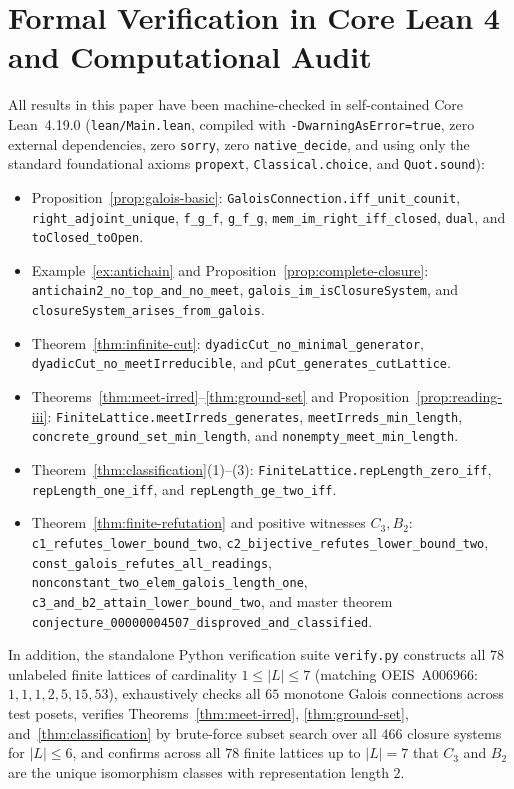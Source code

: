 \documentclass[11pt,a4paper]{article}
\theoremstyle{definition}
\theoremstyle{remark}
\begin{document}
\section{Formal Verification in Core Lean 4 and Computational Audit}

All results in this paper have been machine-checked in self-contained Core Lean~4.19.0 (\nolinkurl{lean/Main.lean}, compiled with \nolinkurl{-DwarningAsError=true}, zero external dependencies, zero \nolinkurl{sorry}, zero \nolinkurl{native_decide}, and using only the standard foundational axioms \nolinkurl{propext}, \nolinkurl{Classical.choice}, and \nolinkurl{Quot.sound}):
{\raggedright
\begin{itemize}
\item Proposition~\ref{prop:galois-basic}: \nolinkurl{GaloisConnection.iff_unit_counit}, \nolinkurl{right_adjoint_unique}, \nolinkurl{f_g_f}, \nolinkurl{g_f_g}, \nolinkurl{mem_im_right_iff_closed}, \nolinkurl{dual}, and \nolinkurl{toClosed_toOpen}.
\item Example~\ref{ex:antichain} and Proposition~\ref{prop:complete-closure}: \nolinkurl{antichain2_no_top_and_no_meet}, \nolinkurl{galois_im_isClosureSystem}, and \nolinkurl{closureSystem_arises_from_galois}.
\item Theorem~\ref{thm:infinite-cut}: \nolinkurl{dyadicCut_no_minimal_generator}, \nolinkurl{dyadicCut_no_meetIrreducible}, and \nolinkurl{pCut_generates_cutLattice}.
\item Theorems~\ref{thm:meet-irred}--\ref{thm:ground-set} and Proposition~\ref{prop:reading-iii}: \nolinkurl{FiniteLattice.meetIrreds_generates}, \nolinkurl{meetIrreds_min_length}, \nolinkurl{concrete_ground_set_min_length}, and \nolinkurl{nonempty_meet_min_length}.
\item Theorem~\ref{thm:classification}(1)--(3): \nolinkurl{FiniteLattice.repLength_zero_iff}, \nolinkurl{repLength_one_iff}, and \nolinkurl{repLength_ge_two_iff}.
\item Theorem~\ref{thm:finite-refutation} and positive witnesses $C_3, B_2$: \nolinkurl{c1_refutes_lower_bound_two}, \nolinkurl{c2_bijective_refutes_lower_bound_two}, \nolinkurl{const_galois_refutes_all_readings}, \nolinkurl{nonconstant_two_elem_galois_length_one}, \nolinkurl{c3_and_b2_attain_lower_bound_two}, and master theorem \nolinkurl{conjecture_00000004507_disproved_and_classified}.
\end{itemize}
}

In addition, the standalone Python verification suite \texttt{verify.py} constructs all $78$ unlabeled finite lattices of cardinality $1 \le |L| \le 7$ (matching OEIS~A006966: $1, 1, 1, 2, 5, 15, 53$), exhaustively checks all $65$ monotone Galois connections across test posets, verifies Theorems~\ref{thm:meet-irred}, \ref{thm:ground-set}, and~\ref{thm:classification} by brute-force subset search over all $466$ closure systems for $|L| \le 6$, and confirms across all $78$ finite lattices up to $|L| = 7$ that $C_3$ and $B_2$ are the unique isomorphism classes with representation length $2$.
\end{document}
